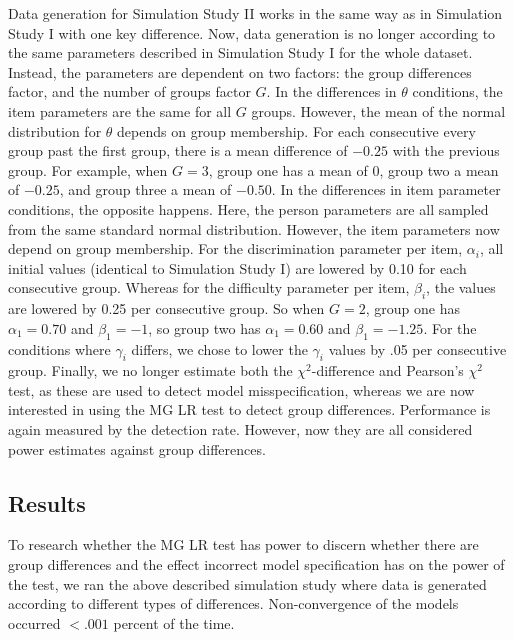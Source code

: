 \documentclass[Royal,sageapa,times,doublespace]{sagej}
\begin{document}
\indent Data generation for Simulation Study II works in the same way as in Simulation Study I with one key difference. Now, data generation is no longer according to the same parameters described in Simulation Study I for the whole dataset. Instead, the parameters are dependent on two factors: the group differences factor, and the number of groups factor $G$. In the differences in $\theta$ conditions, the item parameters are the same for all $G$ groups. However, the mean of the normal distribution for $\theta$ depends on group membership. For each consecutive every group past the first group, there is a mean difference of $-0.25$ with the previous group. For example, when $G = 3$, group one has a mean of 0, group two a mean of $-0.25$, and group three a mean of $-0.50$. In the differences in item parameter conditions, the opposite happens. Here, the person parameters are all sampled from the same standard normal distribution. However, the item parameters now depend on group membership. For the discrimination parameter per item, $\alpha_i$, all initial values (identical to Simulation Study I) are lowered by 0.10 for each consecutive group. Whereas for the difficulty parameter per item, $\beta_i$, the values are lowered by 0.25 per consecutive group. So when $G = 2$, group one has $\alpha_1 = 0.70$ and $\beta_1 = -1$, so group two has $\alpha_1 = 0.60$ and $\beta_1 = -1.25$. For the conditions where $\gamma_i$ differs, we chose to lower the $\gamma_i$ values by .05 per consecutive group. Finally, we no longer estimate both the $\chi^2$-difference and Pearson's $\chi^2$ test, as these are used to detect model misspecification, whereas we are now interested in using the MG LR test to detect group differences. Performance is again measured by the detection rate. However, now they are all considered power estimates against group differences.

\subsection{Results}

To research whether the MG LR test has power to discern whether there are group differences and the effect incorrect model specification has on the power of the test, we ran the above described simulation study where data is generated according to different types of differences. Non-convergence of the models occurred $<.001$ percent of the time. \\
\end{document}
